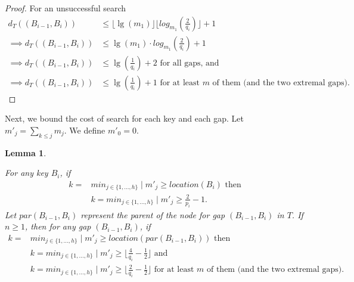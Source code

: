 \documentclass[letterpaper,12pt,titlepage,oneside,final]{book}
\theoremstyle{plain}
\newtheorem{lem}[thm]{Lemma}
\begin{document}
\begin{proof}
\noindent For an unsuccessful search
\begin{align*}
d_T((B_{i-1},B_i)) &\leq \lfloor \lg(m_1) \rfloor \lfloor log_{m_1}(\frac{2}{q_i}) \rfloor + 1 \\
\implies d_T((B_{i-1},B_i)) &\leq \lg(m_1)\cdot log_{m_1}(\frac{2}{q_i}) + 1 \\
\implies d_T((B_{i-1},B_i)) &\leq \lg(\frac{1}{q_i}) + 2 \text{ for all gaps, and} \\
\implies d_T((B_{i-1},B_i)) &\leq \lg(\frac{1}{q_i}) + 1 \text{ for at least $m$ of them (and the two extremal gaps)}.
\end{align*}


\end{proof}

Next, we bound the cost of search for each key and each gap. Let $m'_j = \sum_{k \leq j} m_j$. We define $m'_0 = 0$.

\begin{lem} \label{locationLem}

For any key $B_i$, if
\begin{align*}
k=&min_{j \in \{1, ..., h\}} \mid m'_j \geq location(B_i) \text{ then} \\
&k=min_{j \in \{1, ..., h\}} \mid m'_j \geq \frac{2}{p_i}-1.
\end{align*}
Let $par(B_{i-1}, B_i)$ represent the parent of the node for gap $(B_{i-1}, B_i)$ in $T$. If $n \geq 1$, then for any gap $(B_{i-1}, B_i)$, if 
\begin{align*}
k=&min_{j \in \{1, ..., h\}} \mid m'_j \geq location(par(B_{i-1}, B_i)) \text{ then} \\
&k=min_{j \in \{1, ..., h\}} \mid m'_j \geq \lfloor \frac{4}{q_i}-\frac{1}{2} \rfloor \text{ and} \\
&k=min_{j \in \{1, ..., h\}} \mid m'_j \geq \lfloor \frac{2}{q_i}-\frac{1}{2} \rfloor \text{ for at least $m$ of them (and the two extremal gaps)}.
\end{align*}

\end{lem}
\end{document}
